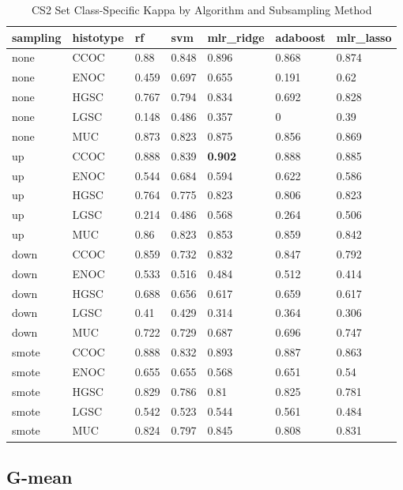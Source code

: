 \documentclass[
]{report}
\begin{document}
\begin{table}

\caption{\label{tab:cs2-kappa-class-table}CS2 Set Class-Specific Kappa by Algorithm and Subsampling Method}
\centering
\begin{tabular}[t]{l|l|l|l|l|l|l}
\hline
sampling & histotype & rf & svm & mlr\_ridge & adaboost & mlr\_lasso\\
\hline
none & CCOC & 0.88 & 0.848 & 0.896 & 0.868 & 0.874\\
\hline
none & ENOC & 0.459 & 0.697 & 0.655 & 0.191 & 0.62\\
\hline
none & HGSC & 0.767 & 0.794 & 0.834 & 0.692 & 0.828\\
\hline
none & LGSC & 0.148 & 0.486 & 0.357 & 0 & 0.39\\
\hline
none & MUC & 0.873 & 0.823 & 0.875 & 0.856 & 0.869\\
\hline
up & CCOC & 0.888 & 0.839 & \textbf{0.902} & 0.888 & 0.885\\
\hline
up & ENOC & 0.544 & 0.684 & 0.594 & 0.622 & 0.586\\
\hline
up & HGSC & 0.764 & 0.775 & 0.823 & 0.806 & 0.823\\
\hline
up & LGSC & 0.214 & 0.486 & 0.568 & 0.264 & 0.506\\
\hline
up & MUC & 0.86 & 0.823 & 0.853 & 0.859 & 0.842\\
\hline
down & CCOC & 0.859 & 0.732 & 0.832 & 0.847 & 0.792\\
\hline
down & ENOC & 0.533 & 0.516 & 0.484 & 0.512 & 0.414\\
\hline
down & HGSC & 0.688 & 0.656 & 0.617 & 0.659 & 0.617\\
\hline
down & LGSC & 0.41 & 0.429 & 0.314 & 0.364 & 0.306\\
\hline
down & MUC & 0.722 & 0.729 & 0.687 & 0.696 & 0.747\\
\hline
smote & CCOC & 0.888 & 0.832 & 0.893 & 0.887 & 0.863\\
\hline
smote & ENOC & 0.655 & 0.655 & 0.568 & 0.651 & 0.54\\
\hline
smote & HGSC & 0.829 & 0.786 & 0.81 & 0.825 & 0.781\\
\hline
smote & LGSC & 0.542 & 0.523 & 0.544 & 0.561 & 0.484\\
\hline
smote & MUC & 0.824 & 0.797 & 0.845 & 0.808 & 0.831\\
\hline
\end{tabular}
\end{table}

\hypertarget{g-mean-3}{%
\subsection{G-mean}\label{g-mean-3}}
\end{document}
